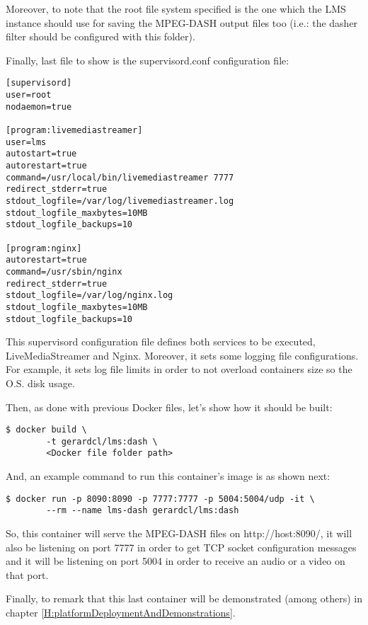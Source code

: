 Moreover, to note that the root file system specified is the one which the LMS instance should use for saving the MPEG-DASH output files too (i.e.: the dasher filter should be configured with this folder).

Finally, last file to show is the supervisord.conf configuration file:

\begin{verbatim}
[supervisord]
user=root
nodaemon=true
 
[program:livemediastreamer]
user=lms
autostart=true
autorestart=true
command=/usr/local/bin/livemediastreamer 7777
redirect_stderr=true
stdout_logfile=/var/log/livemediastreamer.log
stdout_logfile_maxbytes=10MB
stdout_logfile_backups=10

[program:nginx]
autorestart=true
command=/usr/sbin/nginx 
redirect_stderr=true
stdout_logfile=/var/log/nginx.log
stdout_logfile_maxbytes=10MB
stdout_logfile_backups=10
\end{verbatim}

This supervisord configuration file defines both services to be executed, LiveMediaStreamer and Nginx. Moreover, it sets some logging file configurations. For example, it sets log file limits in order to not overload containers size so the O.S. disk usage.

Then, as done with previous Docker files, let's show how it should be built:

\begin{verbatim}
$ docker build \
		-t gerardcl/lms:dash \
		<Docker file folder path>
\end{verbatim}

And, an example command to run this container's image is as shown next:

\begin{verbatim}
$ docker run -p 8090:8090 -p 7777:7777 -p 5004:5004/udp -it \
		--rm --name lms-dash gerardcl/lms:dash 
\end{verbatim}

So, this container will serve the MPEG-DASH files on http://host:8090/, it will also be listening on port 7777 in order to get TCP socket configuration messages and it will be listening on port 5004 in order to receive an audio or a video on that port.

Finally, to remark that this last container will be demonstrated (among others) in chapter \ref{H:platformDeploymentAndDemonstrations}.